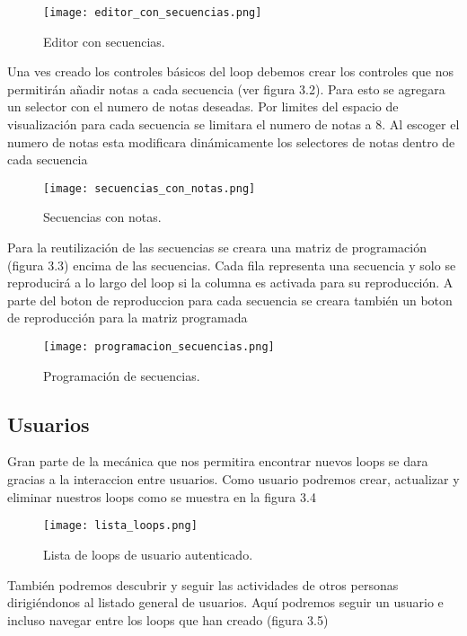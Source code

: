 \begin{figure}
  \texttt{[image: editor\_con\_secuencias.png]}
  \caption{Editor con secuencias.}
  \label{fig:secuencia}
\end{figure}

Una ves creado los controles básicos del loop debemos crear los controles
que nos permitirán añadir notas a cada secuencia (ver figura 3.2). Para
esto se agregara un selector con el numero de notas deseadas. Por limites
del espacio de visualización para cada secuencia se limitara el numero de notas
a 8. Al escoger el numero de notas esta modificara dinámicamente los selectores
de notas dentro de cada secuencia

\begin{figure}
  \texttt{[image: secuencias\_con\_notas.png]}
  \caption{Secuencias con notas.}
  \label{fig:notas}
\end{figure}

Para la reutilización de las secuencias se creara una matriz de
programación (figura 3.3) encima de las secuencias. Cada fila representa una
secuencia y solo se reproducirá a lo largo del loop si la columna es
activada para su reproducción. A parte del boton de reproduccion para
cada secuencia se creara también un boton de reproducción para la matriz
programada

\begin{figure}
  \texttt{[image: programacion\_secuencias.png]}
  \caption{Programación de secuencias.}
  \label{fig:programacion}
\end{figure}

\subsection{Usuarios}

Gran parte de la mecánica que nos permitira encontrar nuevos loops
se dara gracias a la interaccion entre usuarios. Como usuario podremos
crear, actualizar y eliminar nuestros loops como se muestra en la figura 3.4

\begin{figure}
  \texttt{[image: lista\_loops.png]}
  \caption{Lista de loops de usuario autenticado.}
  \label{fig:listaloops}
\end{figure}

También podremos descubrir y seguir las actividades de otros personas
dirigiéndonos al listado general de usuarios. Aquí podremos seguir un usuario
e incluso navegar entre los loops que han creado (figura 3.5)

